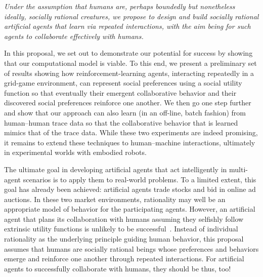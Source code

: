 
\emph{Under the assumption that humans are, perhaps boundedly but
  nonetheless ideally, socially rational creatures, we propose to
  design and build socially rational artificial agents that learn via
  repeated interactions, with the aim being for such agents to
  collaborate effectively with humans.}

In this proposal, we set out to demonstrate our potential for success
by showing that our computational model is viable.  To this end,
we present a preliminary set of results showing how
reinforcement-learning agents, interacting repeatedly in a grid-game
environment, can represent social preferences using a social utility
function so that eventually their emergent collaborative behavior and
their discovered social preferences reinforce one another.  We then go
one step further and show that our approach can also learn (in an
off-line, batch fashion) from human--human trace data so that the
collaborative behavior that is learned mimics that of the trace data.
While these two experiments
are indeed promising, it
remains to extend these techniques to human--machine interactions,
ultimately in experimental worlds with embodied robots.

The ultimate goal in developing artificial agents that act
intelligently in multi-agent scenarios is to apply them to real-world
problems.  To a limited extent, this goal has already been achieved:
artificial agents trade stocks and bid in online ad auctions.  In
these two market environments, rationality may well be an appropriate
model of behavior for the participating agents.  However,
an artificial agent that plans its collaboration with humans assuming
they selfishly follow extrinsic utility functions is unlikely to be
successful~\cite{Camerer:2003,gal04,kahnemanst82}.  Instead of
individual rationality as the underlying principle guiding human
behavior, this proposal assumes that humans are socially rational
beings whose preferences and behaviors emerge and reinforce one
another through repeated interactions.  For artificial agents to
successfully collaborate with humans, they should be thus, too!

